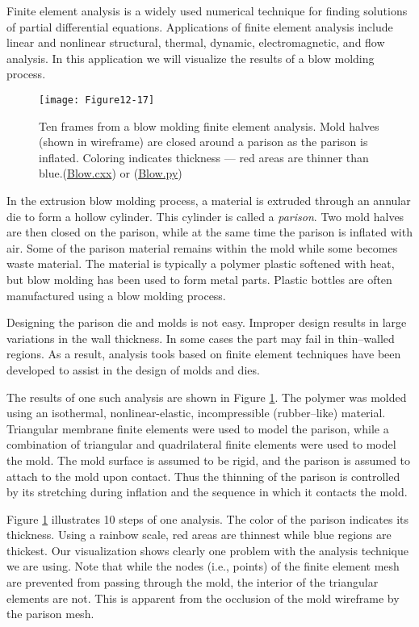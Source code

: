 Finite element analysis is a widely used numerical technique for finding solutions of partial differential equations. Applications of finite element analysis include linear and nonlinear structural, thermal, dynamic, electromagnetic, and flow analysis. In this application we will visualize the results of a blow molding process.

\begin{figure}[!htb]
	\centering
	\texttt{[image: Figure12-17]}
	\caption{Ten frames from a blow molding finite element analysis. Mold halves (shown in wireframe) are closed around a parison as the parison is inflated. Coloring indicates thickness --- red areas are thinner than blue.(\href{https://lorensen.github.io/VTKExamples/site/Cxx/Visualization/Blow/}{Blow.cxx}) or (\href{https://lorensen.github.io/VTKExamples/site/Python/Visualization/Blow/}{Blow.py})}
	\label{fig:Figure12-17}
\end{figure}

In the extrusion blow molding process, a material is extruded through an annular die to form a hollow cylinder. This cylinder is called a \emph{parison}. Two mold halves are then closed on the parison, while at the same time the parison is inflated with air. Some of the parison material remains within the mold while some becomes waste material. The material is typically a polymer plastic softened with heat, but blow molding has been used to form metal parts. Plastic bottles are often manufactured using a blow molding process.

Designing the parison die and molds is not easy. Improper design results in large variations in the wall thickness. In some cases the part may fail in thin--walled regions. As a result, analysis tools based on finite element techniques have been developed to assist in the design of molds and dies.

The results of one such analysis are shown in Figure \ref{fig:Figure12-17}. The polymer was molded using an isothermal, nonlinear-elastic, incompressible (rubber--like) material. Triangular membrane finite elements were used to model the parison, while a combination of triangular and quadrilateral finite elements were used to model the mold. The mold surface is assumed to be rigid, and the parison is assumed to attach to the mold upon contact. Thus the thinning of the parison is controlled by its stretching during inflation and the sequence in which it contacts the mold.

Figure \ref{fig:Figure12-17} illustrates 10 steps of one analysis. The color of the parison indicates its thickness. Using a rainbow scale, red areas are thinnest while blue regions are thickest. Our visualization shows
clearly one problem with the analysis technique we are using. Note that while the nodes (i.e., points) of the finite element mesh are prevented from passing through the mold, the interior of the triangular elements are not. This is apparent from the occlusion of the mold wireframe by the parison mesh.

